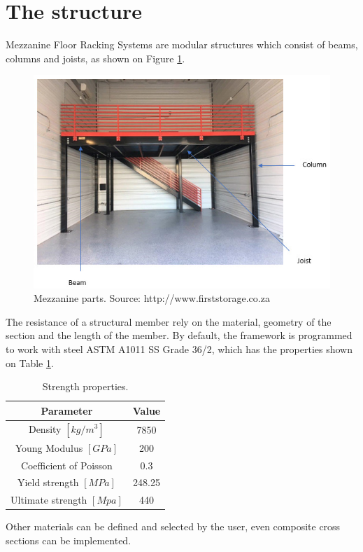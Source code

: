 \section{The structure}

Mezzanine Floor Racking Systems are modular structures which consist of beams, columns and joists, as shown on Figure \ref{mezzanine}.

\begin{figure}[h!]
\centering
\includegraphics[width=\textwidth]{Images/General/mz.jpg}
\caption{Mezzanine parts. \vspace{0.5cm} Source: http://www.firststorage.co.za}
\label{mezzanine}
\end{figure}

\vspace{-0.7cm}

The resistance of a structural member rely on the material, geometry of the section and the length of the member. By default, the framework is programmed to work with steel ASTM A1011 SS Grade 36/2, which has the properties shown on Table \ref{properties}.

\begin{table}[h!]
\centering
\begin{adjustbox}{max width=\textwidth}
\begin{tabular}{c c}
\hline
\textbf{Parameter} & \textbf{Value} \\ \hline
Density $\left[kg/m^3\right]$ & 7850 \\ \hline
Young Modulus $[GPa]$ & 200 \\ \hline
Coefficient of Poisson & 0.3 \\ \hline
Yield strength $[MPa]$ & 248.25 \\ \hline
Ultimate strength $[Mpa]$ & 440 \\ \hline
\end{tabular}
\end{adjustbox}
\caption{Strength properties.}
\label{properties}
\end{table}

Other materials can be defined and selected by the user, even composite cross sections can be implemented.
 
 


